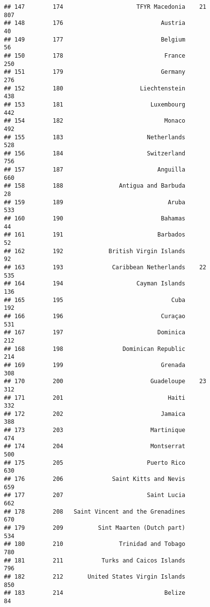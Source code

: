 \documentclass[]{article}
\begin{document}
\begin{verbatim}
## 147        174                     TFYR Macedonia    21          807
## 148        176                            Austria                 40
## 149        177                            Belgium                 56
## 150        178                             France                250
## 151        179                            Germany                276
## 152        180                      Liechtenstein                438
## 153        181                         Luxembourg                442
## 154        182                             Monaco                492
## 155        183                        Netherlands                528
## 156        184                        Switzerland                756
## 157        187                           Anguilla                660
## 158        188                Antigua and Barbuda                 28
## 159        189                              Aruba                533
## 160        190                            Bahamas                 44
## 161        191                           Barbados                 52
## 162        192             British Virgin Islands                 92
## 163        193              Caribbean Netherlands    22          535
## 164        194                     Cayman Islands                136
## 165        195                               Cuba                192
## 166        196                            Curaçao                531
## 167        197                           Dominica                212
## 168        198                 Dominican Republic                214
## 169        199                            Grenada                308
## 170        200                         Guadeloupe    23          312
## 171        201                              Haiti                332
## 172        202                            Jamaica                388
## 173        203                         Martinique                474
## 174        204                         Montserrat                500
## 175        205                        Puerto Rico                630
## 176        206              Saint Kitts and Nevis                659
## 177        207                        Saint Lucia                662
## 178        208   Saint Vincent and the Grenadines                670
## 179        209          Sint Maarten (Dutch part)                534
## 180        210                Trinidad and Tobago                780
## 181        211           Turks and Caicos Islands                796
## 182        212       United States Virgin Islands                850
## 183        214                             Belize                 84

\end{verbatim}
\end{document}
